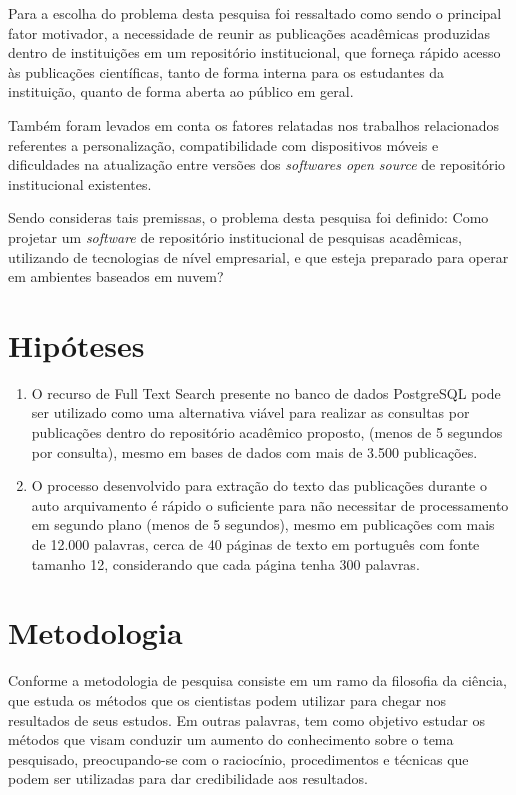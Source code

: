 Para a escolha do problema desta pesquisa foi ressaltado como sendo
o principal fator motivador, a necessidade de reunir as publicações acadêmicas
produzidas dentro de instituições em um repositório institucional,
que forneça rápido acesso às publicações científicas,
tanto de forma interna para os estudantes da instituição,
quanto de forma aberta ao público em geral.

Também foram levados em conta os fatores relatadas nos trabalhos
relacionados referentes a personalização, compatibilidade com
dispositivos móveis e dificuldades na atualização entre versões
dos \emph{softwares open source} de repositório institucional existentes.

Sendo consideras tais premissas, o problema desta pesquisa foi definido:
Como projetar um \emph{software} de repositório institucional de pesquisas
acadêmicas, utilizando de tecnologias de nível empresarial, e que esteja
preparado para operar em ambientes baseados em nuvem?

\section{Hipóteses} \label{sec::Hypothesis}
\begin{enumerate}
    \item O recurso de Full Text Search presente no banco de dados PostgreSQL
          pode ser utilizado como uma alternativa viável para realizar
          as consultas por publicações dentro do repositório acadêmico
          proposto, (menos de 5 segundos por consulta), mesmo em bases de
          dados com mais de 3.500 publicações.

    \item O processo desenvolvido para extração do texto das publicações
          durante o auto arquivamento é rápido o suficiente para não
          necessitar de processamento em segundo plano (menos de 5 segundos),
          mesmo em publicações com mais de 12.000 palavras, cerca de 40 páginas
          de texto em português com fonte tamanho 12, considerando que cada página tenha
          300 palavras.

\end{enumerate}

\section{Metodologia} \label{sec:Methodology}

Conforme \citep[p. 15]{LOVATO:metodologia} a metodologia de pesquisa
consiste em um ramo da filosofia da ciência, que estuda os métodos que
os cientistas podem utilizar para chegar nos resultados de seus estudos.
Em outras palavras, tem como objetivo estudar os métodos que visam
conduzir um aumento do conhecimento sobre o tema pesquisado, preocupando-se
com o raciocínio, procedimentos e técnicas que podem ser utilizadas para
dar credibilidade aos resultados.

